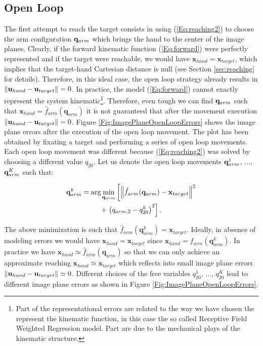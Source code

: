 \subsection{Open Loop}
The first attempt to reach the target consists in using (\ref{Eq:reaching2})
to choose the arm configuration $\mathbf q_{arm}$ which brings the hand to the center 
of the image planes. Clearly, if the forward 
kinematic function (\ref{Eq:forward}) were perfectly represented and if the target were reachable, we would have $\mathbf x_{hand} =  \mathbf x_{target}$, which implies that the target-hand Cartesian distance 
 is null (see Section \ref{sec:reaching} for details). Therefore, in this ideal case, the open loop 
 strategy already results in $\| \mathbf{u}_{hand} - \mathbf{u}_{target} \| = 0$. In practice, the model 
 (\ref{Eq:forward}) cannot exactly represent the system kinematic\footnote{Part of the representational 
 errors are related to the way we have chosen the represent the kinematic function, in this case the
 so called Receptive Field Weighted Regression model. Part are due to the mechanical plays of the
 kinematic structure.}. Therefore, even tough we can find $\mathbf q_{arm}$ such that $\mathbf x_{hand}=
 \hat f_{arm}(\mathbf q_{arm})$ it is not guaranteed that after the movement execution 
 $\| \mathbf{u}_{hand} - \mathbf{u}_{target} \| = 0$. Figure \ref{Fig:ImagePlaneOpenLoopErrors}
 shows the image plane errors after the execution of the open loop movement. The plot has been obtained
 by fixating a target and performing a series of open loop movements. Each open loop
 movement was different because (\ref{Eq:reaching2}) was solved 
 by choosing a different value $q_{20}$. Let us denote the open loop movements $\mathbf q_{arm}^1$, $\dots$, 
 $\mathbf q_{arm}^K$ such that:
 
 \begin{multline} \label{Eq:OpenLoopMovements}
 \mathbf q_{arm}^k = \arg \min_{\mathbf q_{arm}}
  \left[
  \left\| \hat f_{arm}(\mathbf q_{arm}) - \mathbf x_{target}\right\|^2 \right. \\ + \left. \left(q_{arm,2}-q_{20}^k\right)^2
  \right].
 \end{multline}
 
 The above minimization is such that $\hat f_{arm}(\mathbf q_{arm}^k) = \mathbf x_{target}$. Ideally, in absence
 of modeling errors we would have $ \mathbf x_{hand} = \mathbf x_{target}$ since $\mathbf x_{hand} = f_{arm}(\mathbf q_{arm}^k)$. In practice we have $\mathbf x_{hand} \simeq \hat f_{arm}(\mathbf q_{arm})$ 
 so that we can only achieve an approximate reaching $ \mathbf x_{hand} \simeq \mathbf x_{target}$ 
 which reflects into small image plane errors $\| \mathbf{u}_{hand} - \mathbf{u}_{target}\| \simeq 0$. Different choices 
 of the free variables $q_{20}^1$, $\dots$, $q_{20}^K$ lead to different image plane errors as shown 
 in Figure \ref{Fig:ImagePlaneOpenLoopErrors}.



